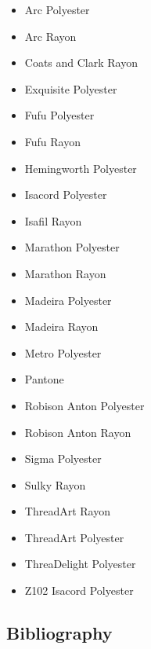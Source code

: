 \documentclass[a4paper, 11pt]{report}
\begin{document}
\begin{itemize}
\item Arc Polyester
\item Arc Rayon
\item Coats and Clark Rayon
\item Exquisite Polyester
\item Fufu Polyester
\item Fufu Rayon
\item Hemingworth Polyester
\item Isacord Polyester
\item Isafil Rayon
\item Marathon Polyester
\item Marathon Rayon
\item Madeira Polyester
\item Madeira Rayon
\item Metro Polyester
\item Pantone
\item Robison Anton Polyester
\item Robison Anton Rayon
\item Sigma Polyester
\item Sulky Rayon
\item ThreadArt Rayon
\item ThreadArt Polyester
\item ThreaDelight Polyester
\item Z102 Isacord Polyester
\end{itemize}

\subsection{Bibliography}
\end{document}
